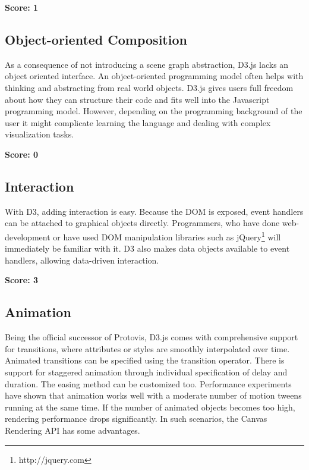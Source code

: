\SuperPar \textbf{Score: 1}

\subsection{Object-oriented Composition}

As a consequence of not introducing a scene graph abstraction, D3.js lacks an object oriented interface. An object-oriented programming model often helps with thinking and abstracting from real world objects. D3.js gives users full freedom about how they can structure their code and fits well into the Javascript programming model. However, depending on the programming background of the user it might complicate learning the language and dealing with complex visualization tasks.

\SuperPar \textbf{Score: 0}


\subsection{Interaction}

With D3, adding interaction is easy. Because the DOM is exposed, event handlers can be attached to graphical objects directly. Programmers, who have done web-development or have used DOM manipulation libraries such as jQuery\footnote{http://jquery.com} will immediately be familiar with it. D3 also makes data objects available to event handlers, allowing data-driven interaction.

\SuperPar \textbf{Score: 3}

\subsection{Animation}

Being the official successor of Protovis, D3.js comes with comprehensive support for transitions, where attributes or styles are smoothly interpolated over time. Animated transitions can be specified using the transition operator. There is support for staggered animation through individual specification of delay and duration. The easing method can be customized too. Performance experiments have shown that animation works well with a moderate number of motion tweens running at the same time. If the number of animated objects becomes too high, rendering performance drops significantly. In such scenarios, the Canvas Rendering API has some advantages.

